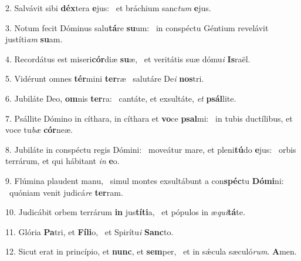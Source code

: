 2. Salvávit sibi \textbf{déx}tera \textbf{e}jus: \ast\  et bráchium sanc\textit{tum} \textbf{e}jus.\

3. Notum fecit Dóminus salu\textbf{tá}re \textbf{su}um: \ast\  in conspéctu Géntium revelávit justíti\textit{am} \textbf{su}am.\

4. Recordátus est miseri\textbf{cór}diæ \textbf{su}æ, \ast\  et veritátis suæ dómu\textit{i} \textbf{Is}raël.\

5. Vidérunt omnes \textbf{tér}mini \textbf{ter}ræ \ast\  salutáre De\textit{i} \textbf{nos}tri.\

6. Jubiláte Deo, \textbf{om}nis \textbf{ter}ra: \ast\  cantáte, et exsultáte, \textit{et} \textbf{psál}lite.\

7. Psállite Dómino in cíthara, in cíthara et \textbf{vo}ce \textbf{psal}mi: \ast\  in tubis ductílibus, et voce tu\textit{bæ} \textbf{cór}neæ.\

8. Jubiláte in conspéctu regis Dómini: \dag\  moveátur mare, et pleni\textbf{tú}do \textbf{e}jus: \ast\  orbis terrárum, et qui hábitant \textit{in} \textbf{e}o.\

9. Flúmina plaudent manu, \dag\  simul montes exsultábunt a con\textbf{spéc}tu \textbf{Dó}\textbf{mi}ni: \ast\  quóniam venit judicá\textit{re} \textbf{ter}ram.\

10. Judicábit orbem terrárum \textbf{in} jus\textbf{tí}\textbf{ti}a, \ast\  et pópulos in æ\textit{qui}\textbf{tá}te.\

11. Glória \textbf{Pa}tri, et \textbf{Fí}\textbf{li}o, \ast\  et Spirítu\textit{i} \textbf{Sanc}to.\

12. Sicut erat in princípio, et \textbf{nunc}, et \textbf{sem}per, \ast\  et in sǽcula sæculó\textit{rum}. \textbf{A}men.\

